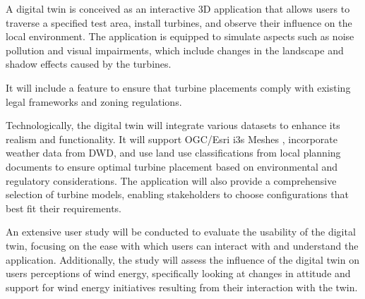 \documentclass[11pt, titlepage, a4paper]{scrartcl}
\begin{document}
\begin{linenumbers}
    A digital twin is conceived as an interactive 3D application that allows users to traverse a specified test area, install turbines, and observe their influence on the local environment. The application is equipped to simulate aspects such as noise pollution and visual impairments, which include changes in the landscape and shadow effects caused by the turbines.

    It will include a feature to ensure that turbine placements comply with existing legal frameworks and zoning regulations.

    Technologically, the digital twin will integrate various datasets to enhance its realism and functionality. It will support OGC/Esri i3s Meshes \cite{esriincI3sspec}, incorporate weather data from DWD, and use land use classifications from local planning documents %
    to ensure optimal turbine placement based on environmental and regulatory considerations. The application will also provide a comprehensive selection of turbine models, enabling stakeholders to choose configurations that best fit their requirements.

    An extensive user study will be conducted to evaluate the usability of the digital twin, focusing on the ease with which users can interact with and understand the application. Additionally, the study will assess the influence of the digital twin on users perceptions of wind energy, specifically looking at changes in attitude and support for wind energy initiatives resulting from their interaction with the twin.






\end{linenumbers}
\end{document}
